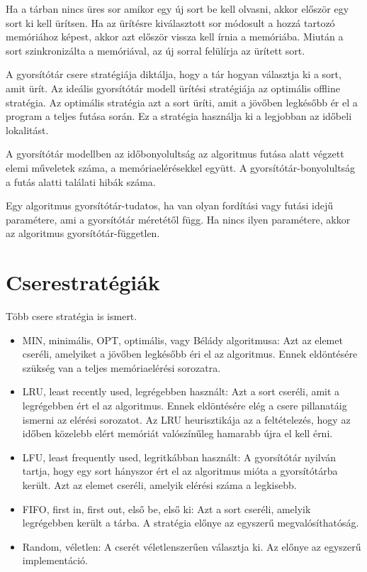 \documentclass[12pt]{report}
\begin{document}
Ha a tárban nincs üres sor amikor egy új sort be kell olvasni,
akkor először egy sort ki kell ürítsen.
Ha az ürítésre kiválasztott sor módosult a hozzá tartozó memóriához képest,
akkor azt először vissza kell írnia a memóriába.
Miután a sort szinkronizálta a memóriával,
az új sorral felülírja az ürített sort.

\bigskip

A gyorsítótár csere stratégiája diktálja,
hogy a tár hogyan választja ki a sort, amit ürít.
Az ideális gyorsítótár modell ürítési stratégiája az optimális offline
stratégia\cite{belady-min}.
Az optimális stratégia azt a sort üríti,
amit a jövőben legkésőbb ér el a program a teljes futása során.
Ez a stratégia használja ki a legjobban az időbeli lokalitást.

A gyorsítótár modellben az időbonyolultság
az algoritmus futása alatt végzett elemi műveletek száma,
a memóriaelérésekkel együtt.
A gyorsítótár-bonyolultság a futás alatti találati hibák száma.

\bigskip

Egy algoritmus gyorsítótár-tudatos, ha van olyan fordítási vagy futási
idejű paramétere, ami a gyorsítótár méretétől függ.
Ha nincs ilyen paramétere, akkor az algoritmus gyorsítótár-független.

\section{Cserestratégiák}

Több csere stratégia is ismert.
\begin{itemize}
\item
MIN, minimális, OPT, optimális, vagy Bélády algoritmusa:
Azt az elemet cseréli, amelyiket a jövőben legkésőbb éri el az algoritmus.
Ennek eldöntésére szükség van a teljes memóriaelérési sorozatra.
\item
LRU, least recently used, legrégebben használt:
Azt a sort cseréli, amit a legrégebben ért el az algoritmus.
Ennek eldöntésére elég a csere pillanatáig ismerni az elérési sorozatot.
Az LRU heurisztikája az a feltételezés,
hogy az időben közelebb elért memóriát valószínűleg hamarabb újra el kell érni.
\item
LFU, least frequently used, legritkábban használt:
A gyorsítótár nyilván tartja, hogy egy sort hányszor ért el az algoritmus
mióta a gyorsítótárba került.
Azt az elemet cseréli, amelyik elérési száma a legkisebb.
\item
FIFO, first in, first out, első be, első ki:
Azt a sort cseréli, amelyik legrégebben került a tárba.
A stratégia előnye az egyszerű megvalósíthatóság.
\item
Random, véletlen:
A cserét véletlenszerűen választja ki.
Az előnye az egyszerű implementáció.
\end{itemize}
\end{document}
